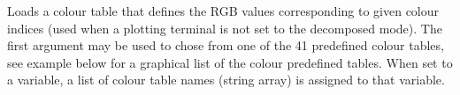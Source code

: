 Loads a colour table that defines the RGB values corresponding to 
  given colour indices (used when a plotting terminal is not set to
  the decomposed mode).
The first argument may be used to chose from one of the 41 predefined
  colour tables, see example below for a graphical list of the colour
  predefined tables.
When set to a variable, a list of colour table names (string array) 
  is assigned to that variable.
